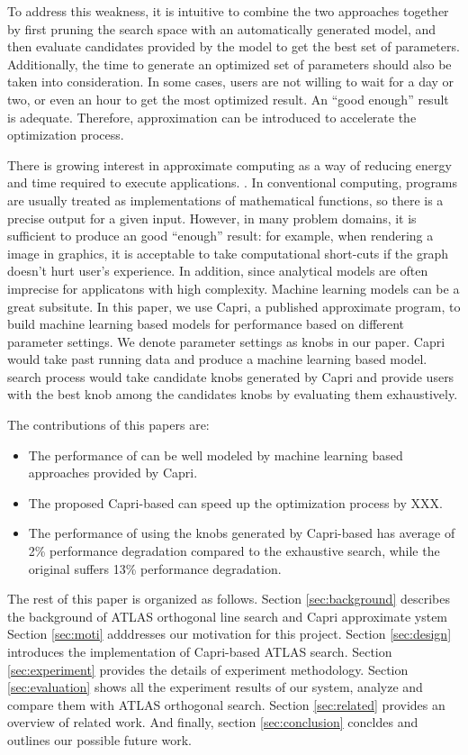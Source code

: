 \par
To address this weakness, it is intuitive to combine the two approaches together by first pruning the search
space with an automatically generated model, and then evaluate candidates
provided by the model to get the best set of parameters.
Additionally, the time to generate an optimized set of parameters
should also be taken into consideration. In some cases, users are not willing
to wait for a day or two, or even an hour to get the most optimized result. An
``good enough'' result is adequate. Therefore, approximation can be introduced
to accelerate the optimization process.

There is growing interest in approximate computing as a way of reducing energy
and time required to execute applications. \cite{ansel2011language,
baek2010green, sidiroglou2011managing, swaminathan2015case}. In conventional
computing, programs are usually treated as implementations of mathematical
functions, so there is a precise output for a given input.
However, in many problem domains, it is sufficient to produce an good ``enough''
result: for example, when rendering a image in graphics, it is
acceptable to take computational short-cuts if the graph doesn't hurt user's
experience. In addition, since analytical models are often imprecise for
applicatons with high complexity. Machine learning models can be a great
subsitute. In this paper, we use Capri\cite{sui2016proactive}, a published
approximate program, to build machine learning based models for \gem performance
based on different parameter settings. We denote parameter settings as knobs in
our paper. Capri would take past \atl running data and produce a machine
learning based model. \atl search process would take candidate knobs generated
by Capri and provide users with the best knob among the candidates knobs by
evaluating them exhaustively.


The contributions of this papers are:
\begin{itemize}
\item The performance of \gem can be well modeled by machine learning based
approaches provided by Capri.
\item The proposed Capri-based \atl can speed up the optimization process by XXX.
\item The performance of \gem using the knobs generated by Capri-based \atl
has average of 2\% performance degradation compared to the exhaustive search,
while the original \atl suffers 13\% performance degradation.
\end{itemize}

\par
The rest of this paper is organized as follows. Section \ref{sec:background} describes the background of ATLAS
orthogonal line search and Capri approximate ystem
Section \ref{sec:moti} adddresses our motivation for this project.
Section \ref{sec:design} introduces the implementation of Capri-based ATLAS search.
Section \ref{sec:experiment} provides the details of experiment methodology.
Section \ref{sec:evaluation} shows all the experiment results of our system, analyze and compare them with ATLAS orthogonal search.
Section \ref{sec:related} provides an overview of related work.
And finally, section \ref{sec:conclusion} concldes and outlines our possible future work.

